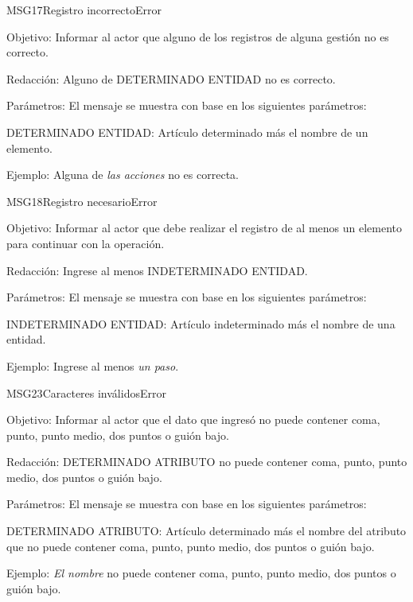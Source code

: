 \begin{mensaje}{MSG17}{Registro incorrecto}{Error}
    \item[Objetivo:] Informar al actor que alguno de los registros de alguna gestión no es correcto.
    \item[Redacción:] Alguno de DETERMINADO ENTIDAD no es correcto.
    \item[Parámetros:] El mensaje se muestra con base en los siguientes parámetros:
    \begin{Citemize}
	\item DETERMINADO ENTIDAD: Artículo determinado más el nombre de un elemento.
    \end{Citemize}
    \item[Ejemplo:] Alguna de {\em las acciones} no es correcta.
\end{mensaje}
\begin{mensaje}{MSG18}{Registro necesario}{Error}
    \item[Objetivo:] Informar al actor que debe realizar el registro de al menos un elemento para continuar con la operación.
    \item[Redacción:] Ingrese al menos INDETERMINADO ENTIDAD.
    \item[Parámetros:] El mensaje se muestra con base en los siguientes parámetros:
    \begin{Citemize}
	\item INDETERMINADO ENTIDAD: Artículo indeterminado más el nombre de una entidad.
    \end{Citemize}
    \item[Ejemplo:] Ingrese al menos {\em un paso}.
\end{mensaje}
\begin{mensaje}{MSG23}{Caracteres inválidos}{Error}
    \item[Objetivo:] Informar al actor que el dato que ingresó no puede contener coma, punto, punto medio, dos puntos o guión bajo.
    \item[Redacción:] DETERMINADO ATRIBUTO no puede contener coma, punto, punto medio, dos puntos o guión bajo.
    \item[Parámetros:] El mensaje se muestra con base en los siguientes parámetros:
    \begin{Citemize}
	\item DETERMINADO ATRIBUTO: Artículo determinado más el nombre del atributo que no puede contener coma, punto, punto medio, dos puntos o guión bajo.
    \end{Citemize}
    \item[Ejemplo:] { \em El nombre} no puede contener coma, punto, punto medio, dos puntos o guión bajo.
\end{mensaje}
